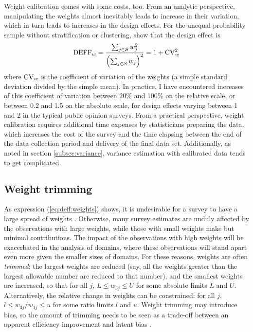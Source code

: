 Weight calibration comes with some costs, too. From an analytic perspective,
manipulating the weights almost inevitably leads to increase in their
variation, which in turn leads to increases in the design effects.
For the unequal probability sample without stratification or clustering,
\citet{korn:graubard:1999} show that the design effect is
\begin{equation}
    {\rm DEFF}_w = \frac{\sum_{j \in \mathcal{S}} w_j^2 }%
       {\Bigl(\sum_{j \in \mathcal{S}} w_j\Bigr)^2}
    = 1 + {\rm CV}_w^2
    \label{eq:deff:weights}
\end{equation}
where ${\rm CV}_w$ is the coefficient of variation of the weights
(a simple standard deviation divided by the simple mean).
In practice, I have encountered increases of this coefficient
of variation between 20\% and 100\% on the relative scale,
or between 0.2 and 1.5 on the absolute scale, for design effects
varying between 1 and 2 in the typical public opinion surveys.
From a practical perspective, weight calibration requires
additional time expenses by statisticians preparing the data,
which increases the cost of the survey and the time elapsing
between the end of the data collection period and delivery
of the final data set. Additionally, as noted in section
\ref{subsec:variance}, variance estimation with calibrated
data tends to get complicated.

\subsection{Weight trimming}
\label{subsec:trimming}

As expression (\ref{eq:deff:weights}) shows, it is undesirable
for a survey to have a large spread of weights \citep{theberge:2000}.
Otherwise, many survey
estimates are unduly affected by the observations with large weights,
while those with small weights make but minimal contributions.
The impact of the observations with high weights will be exacerbated
in the analysis of domains, where these observations will stand apart
even more given the smaller sizes of domains.
For these reasons, weights are often {\it trimmed}: the largest
weights are reduced (say, all the weights greater than the largest allowable
number are reduced to that number), and the smallest weights are increased,
so that for all $j$, $L \le w_{3j} \le U$ for some absolute limits $L$ and $U$.
Alternatively, the relative change in weights can be constrained:
for all $j$, $l \le w_{3j}/w_{1j} \le u$ for some ratio limits $l$ and $u$.
Weight trimming may introduce bias, so the amount of trimming needs to be
seen as a trade-off between an apparent efficiency improvement
and latent bias \citep{elliott:2008}.

